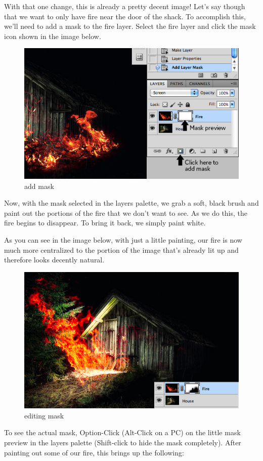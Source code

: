 With that one change, this is already a pretty decent image! Let’s say though that we want to only have fire near the door of the shack. To accomplish this, we’ll need to add a mask to the fire layer. Select the fire layer and click the mask icon shown in the image below.

\begin{figure}
\centering
\includegraphics[width=0.7\linewidth]{Photos/masking_addMask}
\caption{add mask}
\label{fig:masking_addMask}
\end{figure}

Now, with the mask selected in the layers palette, we grab a soft, black brush and paint out the portions of the fire that we don’t want to see. As we do this, the fire begins to disappear. To bring it back, we simply paint white.

As you can see in the image below, with just a little painting, our fire is now much more centralized to the portion of the image that’s already lit up and therefore looks decently natural.

\begin{figure}
\centering
\includegraphics[width=0.7\linewidth]{Photos/masking_editingMask}
\caption{editing mask}
\label{fig:masking_editingMask}
\end{figure}

To see the actual mask, Option-Click (Alt-Click on a PC) on the little mask preview in the layers palette (Shift-click to hide the mask completely). After painting out some of our fire, this brings up the following:

